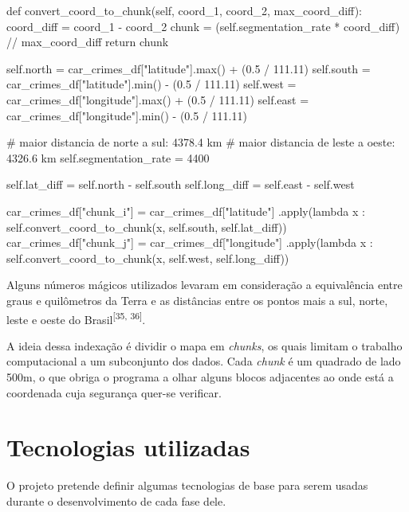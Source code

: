 \begin{python}
def convert_coord_to_chunk(self, coord_1, coord_2, max_coord_diff):
    coord_diff = coord_1 - coord_2
    chunk = (self.segmentation_rate * coord_diff) // max_coord_diff
    return chunk

    self.north = car_crimes_df["latitude"].max() + (0.5 / 111.11)
    self.south = car_crimes_df["latitude"].min() - (0.5 / 111.11)
    self.west = car_crimes_df["longitude"].max() + (0.5 / 111.11)
    self.east = car_crimes_df["longitude"].min() - (0.5 / 111.11)

    # maior distancia de norte a sul: 4378.4 km
    # maior distancia de leste a oeste: 4326.6 km
    self.segmentation_rate = 4400

    self.lat_diff = self.north - self.south
    self.long_diff = self.east - self.west

    
    car_crimes_df["chunk_i"] = car_crimes_df["latitude"]
        .apply(lambda x : 
        self.convert_coord_to_chunk(x, self.south, self.lat_diff))
    car_crimes_df["chunk_j"] = car_crimes_df["longitude"]
        .apply(lambda x : 
        self.convert_coord_to_chunk(x, self.west, self.long_diff))
\end{python}

Alguns números mágicos utilizados levaram em consideração a equivalência entre graus e quilômetros da Terra e as distâncias entre os pontos mais a sul, norte, leste e oeste do Brasil\textsuperscript{[35, 36]}.

A ideia dessa indexação é dividir o mapa em \textit{chunks}, os quais limitam o trabalho computacional a um subconjunto dos dados. Cada \textit{chunk} é um quadrado de lado 500m, o que obriga o programa a olhar alguns blocos adjacentes ao onde está a coordenada cuja segurança quer-se verificar.

    
    
    

 
\section{Tecnologias utilizadas}
O projeto pretende definir algumas tecnologias de base para serem usadas durante o desenvolvimento de cada fase dele.

